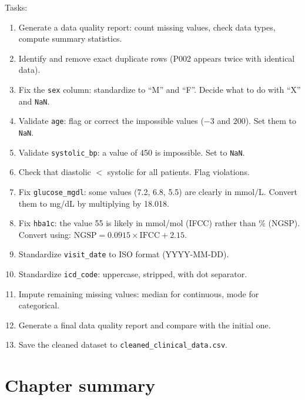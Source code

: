 \begin{exercise}
Tasks:
\begin{enumerate}
  \item Generate a data quality report: count missing values, check data types, compute summary statistics.
  \item Identify and remove exact duplicate rows (P002 appears twice with identical data).
  \item Fix the \texttt{sex} column: standardize to ``M'' and ``F''. Decide what to do with ``X'' and \texttt{NaN}.
  \item Validate \texttt{age}: flag or correct the impossible values ($-3$ and $200$). Set them to \texttt{NaN}.
  \item Validate \texttt{systolic\_bp}: a value of 450 is impossible. Set to \texttt{NaN}.
  \item Check that diastolic $<$ systolic for all patients. Flag violations.
  \item Fix \texttt{glucose\_mgdl}: some values (7.2, 6.8, 5.5) are clearly in mmol/L. Convert them to mg/dL by multiplying by 18.018.
  \item Fix \texttt{hba1c}: the value 55 is likely in mmol/mol (IFCC) rather than \% (NGSP). Convert using: $\text{NGSP} = 0.0915 \times \text{IFCC} + 2.15$.
  \item Standardize \texttt{visit\_date} to ISO format (YYYY-MM-DD).
  \item Standardize \texttt{icd\_code}: uppercase, stripped, with dot separator.
  \item Impute remaining missing values: median for continuous, mode for categorical.
  \item Generate a final data quality report and compare with the initial one.
  \item Save the cleaned dataset to \texttt{cleaned\_clinical\_data.csv}.
\end{enumerate}
\end{exercise}

\section{Chapter summary}

